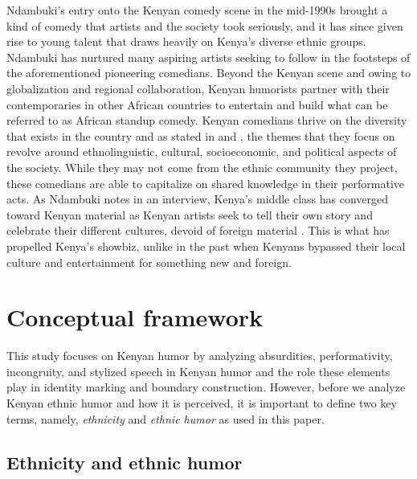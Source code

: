 \documentclass[output=paper]{langsci/langscibook}
\begin{document}
Ndambuki’s entry onto the Kenyan comedy scene in the mid-1990s brought a kind of comedy that artists and the society took seriously, and it has since given rise to young talent that draws heavily on Kenya’s diverse ethnic groups. Ndambuki has nurtured many aspiring artists seeking to follow in the footsteps of the aforementioned pioneering comedians. Beyond the Kenyan scene and owing to globalization and regional collaboration, Kenyan humorists partner with their contemporaries in other African countries to entertain and build what can be referred to as African standup comedy. Kenyan comedians thrive on the diversity that exists in the country and as stated in  and , the themes that they focus on revolve around ethnolinguistic, cultural, socioeconomic, and political aspects of the society. While they may not come from the ethnic community they project, these comedians are able to capitalize on shared knowledge in their performative acts. As Ndambuki notes in an interview, Kenya’s middle class has converged toward Kenyan material as Kenyan artists seek to tell their own story and celebrate their different cultures, devoid of foreign material \citep{Kimani2014}. This is what has propelled Kenya’s showbiz, unlike in the past when Kenyans bypassed their local culture and entertainment for something new and foreign. 

\section{Conceptual framework}

This study focuses on Kenyan humor by analyzing absurdities, performativity, incongruity, and stylized speech in Kenyan humor and the role these elements play in identity marking and boundary construction. However, before we analyze Kenyan ethnic humor and how it is perceived, it is important to define two key terms, namely, \textit{ethnicity} and \textit{ethnic humor} as used in this paper.

\subsection{Ethnicity and ethnic humor}
\end{document}
